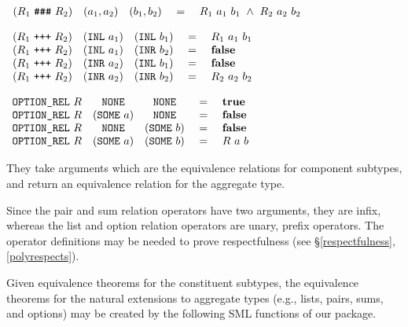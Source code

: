 \documentclass[envcountsame,runningheads]{llncs}
\begin{document}
\begin{definition}
\label{pairrel}
$\begin{array}[t]{lcccl}
(R_1\ \mbox{\tt \#\#\#}\ R_2) & (a_1, a_2) & (b_1, b_2) & \ = \ 
   & R_1\ a_1\ b_1 \ \wedge \ R_2\ a_2\ b_2
\end{array}$
\end{definition}

\begin{definition}
\label{sumrel}
$\begin{array}[t]{lcccl}
(R_1\ \mbox{\tt +++}\ R_2) & (\mbox{\tt INL}\ a_1) & (\mbox{\tt INL}\ b_1) & \ = \ 
   & R_1\ a_1\ b_1  \\
(R_1\ \mbox{\tt +++}\ R_2) & (\mbox{\tt INL}\ a_1) & (\mbox{\tt INR}\ b_2) & \ = \ 
   & \mbox{\bf false}  \\
(R_1\ \mbox{\tt +++}\ R_2) & (\mbox{\tt INR}\ a_2) & (\mbox{\tt INL}\ b_1) & \ = \ 
   & \mbox{\bf false}  \\
(R_1\ \mbox{\tt +++}\ R_2) & (\mbox{\tt INR}\ a_2) & (\mbox{\tt INR}\ b_2) & \ = \ 
   & R_2\ a_2\ b_2  
\end{array}$
\end{definition}

\begin{definition}
\label{optionrel}
$\begin{array}[t]{lcccl}
\mbox{\tt OPTION\_REL}\ R & \mbox{\tt NONE} & \mbox{\tt NONE} & \ = \ 
   & \mbox{\bf true}  \\
\mbox{\tt OPTION\_REL}\ R & (\mbox{\tt SOME}\ a) & \mbox{\tt NONE} & \ = \ 
   & \mbox{\bf false}  \\
\mbox{\tt OPTION\_REL}\ R & \mbox{\tt NONE} & (\mbox{\tt SOME}\ b) & \ = \ 
   & \mbox{\bf false}  \\
\mbox{\tt OPTION\_REL}\ R & (\mbox{\tt SOME}\ a) & (\mbox{\tt SOME}\ b) & \ = \ 
   & R\ a\ b  
\end{array}$
\end{definition}

They
take
arguments which are the
equivalence relations for component subtypes, and return
an equivalence relation for the aggregate type.

Since the pair and sum relation operators have two arguments,
they are infix, whereas the list and option relation operators
are unary, prefix operators.
The operator definitions
may be needed to prove respectfulness
(see \S \ref{respectfulness}, \ref{polyrespects}).

Given equivalence theorems for the constituent subtypes, the
equivalence theorems for the natural extensions to aggregate types (e.g.,
lists, pairs, sums, and options) may be created by the following
SML functions of our package.
\end{document}

